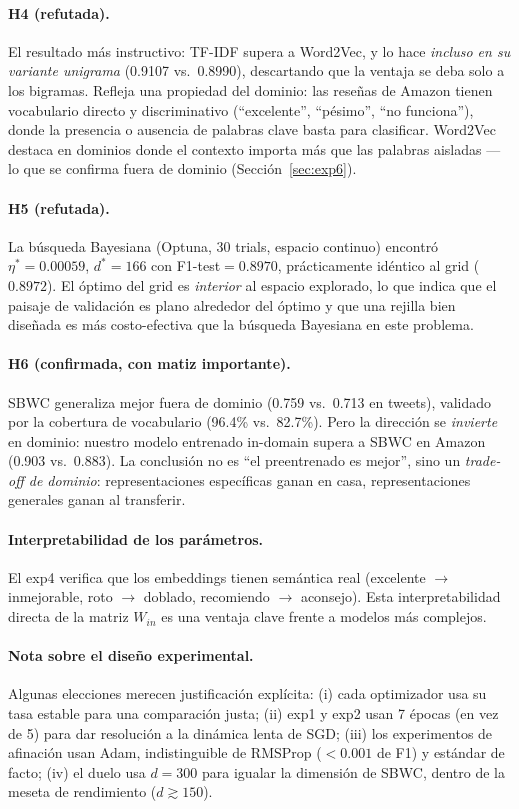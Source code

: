 \documentclass[11pt]{article}
\begin{document}
\paragraph{H4 (refutada).} El resultado más instructivo: TF-IDF supera a Word2Vec, y lo hace
\emph{incluso en su variante unigrama} (0.9107 vs.\ 0.8990), descartando que la ventaja se
deba solo a los bigramas. Refleja una propiedad del dominio: las reseñas de Amazon tienen
vocabulario directo y discriminativo (``excelente'', ``pésimo'', ``no funciona''), donde la
presencia o ausencia de palabras clave basta para clasificar. Word2Vec destaca en dominios
donde el contexto importa más que las palabras aisladas --- lo que se confirma fuera de
dominio (Sección~\ref{sec:exp6}).

\paragraph{H5 (refutada).} La búsqueda Bayesiana (Optuna, 30 trials, espacio continuo)
encontró $\eta^{*}=0.00059$, $d^{*}=166$ con F1-test$=0.8970$, prácticamente idéntico al grid
($0.8972$). El óptimo del grid es \emph{interior} al espacio explorado, lo que indica que el
paisaje de validación es plano alrededor del óptimo y que una rejilla bien diseñada es más
costo-efectiva que la búsqueda Bayesiana en este problema.

\paragraph{H6 (confirmada, con matiz importante).} SBWC generaliza mejor fuera de dominio
(0.759 vs.\ 0.713 en tweets), validado por la cobertura de vocabulario (96.4\% vs.\ 82.7\%).
Pero la dirección se \emph{invierte} en dominio: nuestro modelo entrenado in-domain supera a
SBWC en Amazon (0.903 vs.\ 0.883). La conclusión no es ``el preentrenado es mejor'', sino un
\emph{trade-off de dominio}: representaciones específicas ganan en casa, representaciones
generales ganan al transferir.

\paragraph{Interpretabilidad de los parámetros.} El exp4 verifica que los embeddings tienen
semántica real (excelente $\to$ inmejorable, roto $\to$ doblado, recomiendo $\to$ aconsejo).
Esta interpretabilidad directa de la matriz $W_{in}$ es una ventaja clave frente a modelos
más complejos.

\paragraph{Nota sobre el diseño experimental.} Algunas elecciones merecen justificación
explícita: (i) cada optimizador usa su tasa estable para una comparación justa; (ii) exp1 y
exp2 usan 7 épocas (en vez de 5) para dar resolución a la dinámica lenta de SGD; (iii) los
experimentos de afinación usan Adam, indistinguible de RMSProp ($<0.001$ de F1) y estándar de
facto; (iv) el duelo usa $d=300$ para igualar la dimensión de SBWC, dentro de la meseta de
rendimiento ($d\gtrsim 150$).
\end{document}
